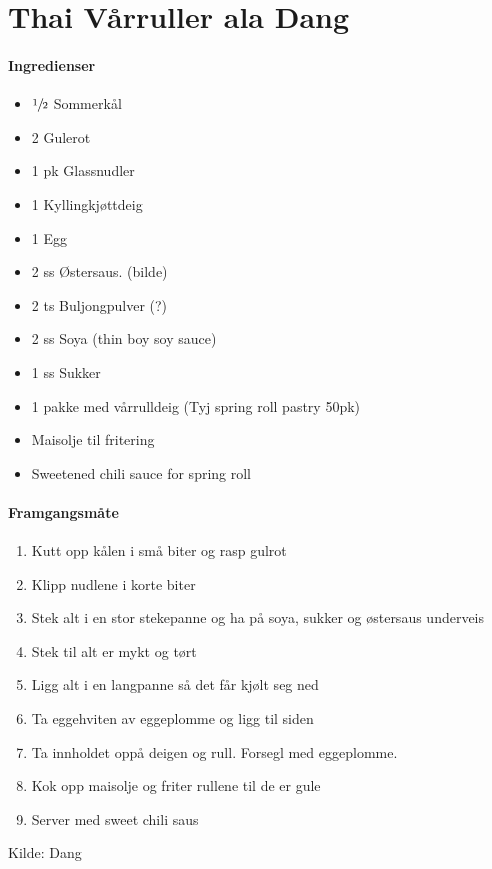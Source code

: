 \section{Thai Vårruller ala Dang}


\paragraph{Ingredienser}
\begin{itemize}[noitemsep]
	\item  $\sfrac{1}{2}$  Sommerkål
	\item 2 Gulerot
	\item 1 pk Glassnudler
	\item 1 Kyllingkjøttdeig
	\item 1 Egg
	\item 2 ss Østersaus. (bilde)
	\item 2 ts Buljongpulver (?)
	\item 2 ss Soya (thin boy soy sauce)
	\item 1 ss Sukker
	\item 1 pakke med vårrulldeig (Tyj spring roll pastry 50pk)
	\item Maisolje til fritering
	\item Sweetened chili sauce for spring roll
\end{itemize}

\paragraph{Framgangsmåte}
\begin{enumerate}[noitemsep]
	\item Kutt opp kålen i små biter og rasp gulrot
	\item Klipp nudlene i korte biter
	\item Stek alt i en stor stekepanne og ha  på soya, sukker og østersaus underveis
	\item Stek til alt er mykt og tørt
	\item Ligg alt i en langpanne så det får kjølt seg ned
	\item Ta eggehviten av eggeplomme og ligg til siden
	\item Ta innholdet oppå deigen og rull.  Forsegl med eggeplomme.
	\item Kok opp maisolje og friter rullene til de er gule
	\item Server med sweet chili saus
\end{enumerate}

Kilde: Dang
